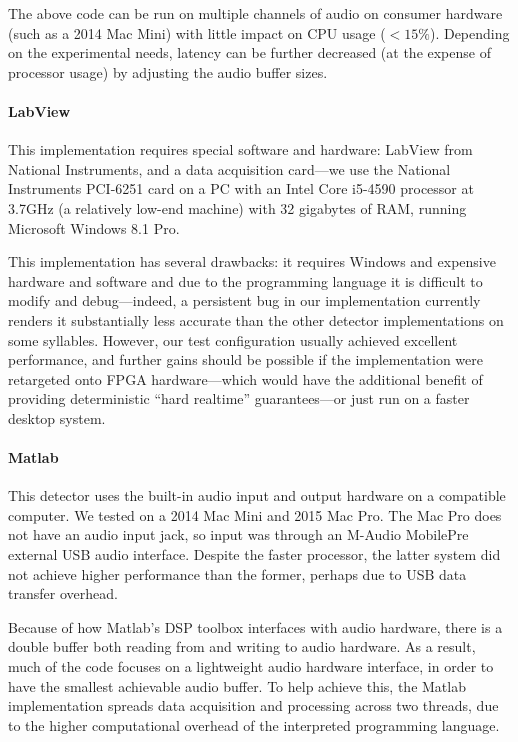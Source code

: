 \documentclass[10pt,letterpaper]{article}
\renewcommand{\subsubsection}[1]{\paragraph{#1}}
\begin{document}
The above code can be run on multiple channels of audio on 
consumer hardware (such as a 2014 Mac Mini) with little impact
on CPU usage ($<15\%$). Depending on the experimental needs, latency
can be further decreased (at the expense of processor usage) by
adjusting the audio buffer sizes.

\subsubsection{LabView}

This implementation requires special software and hardware: LabView from National Instruments, and a data acquisition card---we use the National Instruments PCI-6251 card on a PC with an Intel Core i5-4590 processor at 3.7GHz (a relatively low-end machine) with 32 gigabytes of RAM, running Microsoft Windows 8.1 Pro.

This implementation has several drawbacks: it requires Windows and expensive hardware and software and due to the programming language it is difficult to modify and debug---indeed, a persistent bug in our implementation currently renders it substantially less accurate than the other detector implementations on some syllables. However, our test configuration usually achieved excellent performance, and further gains should be possible if the implementation were retargeted onto FPGA hardware---which would have the additional benefit of providing deterministic ``hard realtime'' guarantees---or just run on a faster desktop system.

\subsubsection{Matlab}

This detector uses the built-in audio input and output hardware on a compatible computer.  We tested on a 2014 Mac Mini and 2015 Mac Pro.  The Mac Pro does not have an audio input jack, so input was through an M-Audio MobilePre external USB audio interface.  Despite the faster processor, the latter system did not achieve higher performance than the former, perhaps due to USB data transfer overhead.

Because of how Matlab's DSP toolbox interfaces with audio hardware, there is a double buffer both reading from and writing to audio hardware. As a result, much of the code focuses on a lightweight audio hardware interface, in order to have the smallest achievable audio buffer. To help achieve this, the Matlab implementation spreads data acquisition and processing across two threads, due to the higher computational overhead of the interpreted programming language.
\end{document}
